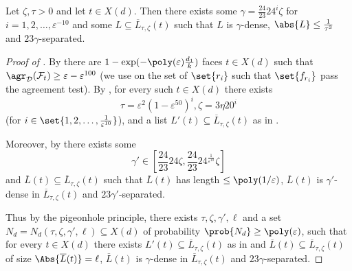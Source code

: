 \begin{claim} \label{claim:good-gamma-for-every-t-and-delta}
    Let \(\zeta,\tau > 0\) and let \(t \in X(d)\). Then there exists some \(\gamma = \frac{24}{23} 24^i \zeta\) for \(i=1,2,\dots,\varepsilon^{-10}\) and some \(L \subseteq \overline{L}_{\tau,\zeta}(t)\) such that \(L\) is \(\gamma\)-dense, \(\abs{L} \leq \frac{1}{\tau^3}\) and \(23\gamma\)-separated.
\end{claim}

\begin{proof}[Proof of ]
    By  there are \(1-\exp(-\poly(\varepsilon)\frac{d_1}{k})\) faces \(t \in X(d)\) such that \(\agr_{\mathcal{D}}(\mathcal{F}_t) \geq \varepsilon - \varepsilon^{100}\) (we use  on the set of \(\set{r_i}\) such that \(\set{f_{r_i}}\) pass the agreement test).
    By , for every such \(t \in X(d)\) there exists \[\tau = \varepsilon^2(1-\varepsilon^{50})^i, \zeta = 3\eta 20^i\] (for \(i \in \set{1,2,\dots,\frac{1}{\varepsilon^{10}}}\)), and a list \(L'(t) \subseteq \overline{L}_{\tau,\zeta}(t)\) as in . 
    
    Moreover, by  there exists some 
    \[\gamma' \in [\frac{24}{23} 24\zeta,\frac{24}{23} 24^{\frac{1}{\varepsilon^{10}}}\zeta]\]
    and \(\overline{L}(t) \subseteq \overline{L}_{\tau,\zeta}(t)\) such that \(\overline{L}(t)\) has length \(\leq \poly(1/\varepsilon)\), \(\overline{L}(t)\) is \(\gamma'\)-dense in \(\overline{L}_{\tau,\zeta}(t)\) and \(23\gamma'\)-separated.

    Thus by the pigeonhole principle, there exists \(\tau,\zeta,\gamma',\ell\) and a set \(N_d = N_d(\tau,\zeta,\gamma',\ell) \subseteq X(d)\) of probability \(\prob{N_d} \geq \poly(\varepsilon)\), such that for every \(t \in X(d)\) there exists \(L'(t) \subseteq \overline{L}_{\tau,\zeta}(t)\) as in  and \(\overline{L}(t) \subseteq \overline{L}_{\tau,\zeta}(t)\) of size \(\Abs{\overline{L}(t)}=\ell\), \(\overline{L}(t)\) is \(\gamma\)-dense in \(\overline{L}_{\tau,\zeta}(t)\) and \(23\gamma\)-separated.


\end{proof}
